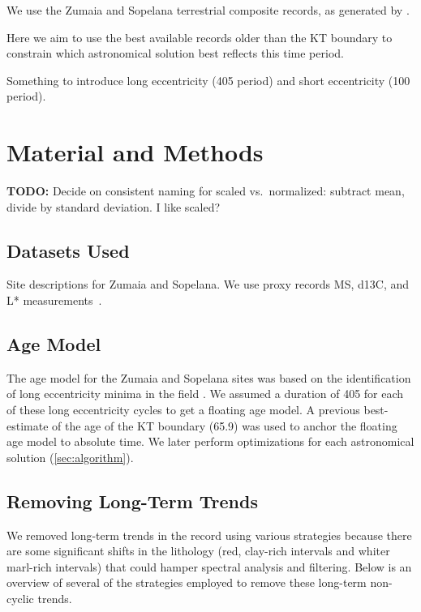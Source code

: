 \documentclass[draft]{agujournal2019}
\begin{document}
We use the Zumaia and Sopelana terrestrial composite records, as generated by .

Here we aim to use the best available records older than the \gls{KT} boundary to constrain which astronomical solution best reflects this time period.

Something to introduce long eccentricity (\qty{405}{\kiloyear} period) and short eccentricity (\qty{100}{\kiloyear} period).

\section{Material and Methods}\label{sec:mm}

\textbf{TODO:} Decide on consistent naming for scaled vs.\ normalized: subtract mean, divide by standard deviation. I like scaled?

\subsection{Datasets Used}\label{sec:data}

Site descriptions for Zumaia and Sopelana.
We use proxy records \gls{MS}, \gls{d13C}, and \gls{L*} measurements~\cite{Batenburg2012,Batenburg2014}.

\subsection{Age Model}\label{sec:agemodel}

The age model for the Zumaia and Sopelana sites was based on the identification of long eccentricity minima in the field .
We assumed a duration of \qty{405}{\kiloyear} for each of these long eccentricity cycles to get a floating age model.
A previous best-estimate of the age of the \gls{KT} boundary (\qty{65.9}{\millionyearago}) was used to anchor the floating age model to absolute time.
We later perform optimizations for each astronomical solution (\cref{sec:algorithm}).

\subsection{Removing Long-Term Trends}\label{sec:detrend}

We removed long-term trends in the record using various strategies because there are some significant shifts in the lithology (red, clay-rich intervals and whiter marl-rich intervals) that could hamper spectral analysis and filtering.
Below is an overview of several of the strategies employed to remove these long-term non-cyclic trends.
\end{document}
